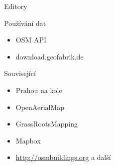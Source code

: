\documentclass[xcolor=dvipsnames]{beamer}
\begin{document}
\begin{frame}{Editory}
    \begin{center}
    \end{center}
\end{frame}

\begin{frame}{Používání dat}
\begin{itemize}
    \item OSM API
    \item download.geofabrik.de
\end{itemize}
\end{frame}

\begin{frame}{Související}
\begin{itemize}
    \item Prahou na kole
    \item OpenAerialMap
    \item GrassRootsMapping
    \item Mapbox
    \item \href{http://osmbuildings.org}{http://osmbuildings.org}  a další
\end{itemize}
\end{frame}
\end{document}
